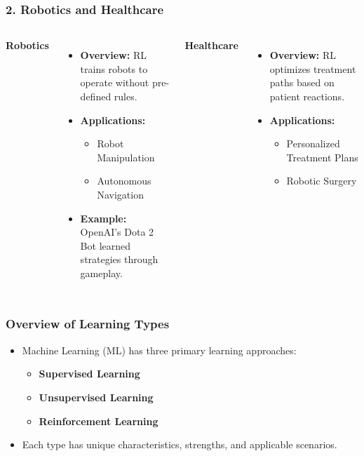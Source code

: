 \documentclass{beamer}
\begin{document}
\begin{frame}[fragile]
    \frametitle{2. Robotics and Healthcare}
    \begin{columns}
        \textbf{Robotics}
        \begin{itemize}
            \item \textbf{Overview:} RL trains robots to operate without pre-defined rules.
            \item \textbf{Applications:}
            \begin{itemize}
                \item Robot Manipulation
                \item Autonomous Navigation
            \end{itemize}
            \item \textbf{Example:} OpenAI's Dota 2 Bot learned strategies through gameplay.
        \end{itemize}
        
        \textbf{Healthcare}
        \begin{itemize}
            \item \textbf{Overview:} RL optimizes treatment paths based on patient reactions.
            \item \textbf{Applications:}
            \begin{itemize}
                \item Personalized Treatment Plans
                \item Robotic Surgery
            \end{itemize}
        \end{itemize}
    \end{columns}
\end{frame}

\begin{frame}[fragile]
    \frametitle{Overview of Learning Types}
    \begin{itemize}
        \item Machine Learning (ML) has three primary learning approaches:
        \begin{itemize}
            \item \textbf{Supervised Learning}
            \item \textbf{Unsupervised Learning}
            \item \textbf{Reinforcement Learning}
        \end{itemize}
        \item Each type has unique characteristics, strengths, and applicable scenarios.
    \end{itemize}
\end{frame}
\end{document}
